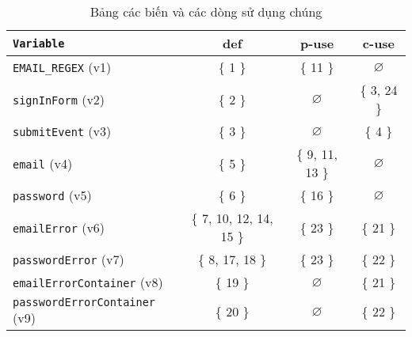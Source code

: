 \documentclass{article}
\begin{document}
\FloatBarrier
\begin{table}[htp]
    \centering
    \begin{tabular}{l|c|c|c}
        \texttt{Variable}                    & def                        & p-use                 & c-use      \\
        \toprule
        \bottomrule
        \texttt{EMAIL\_REGEX} (v1)           & \{ 1 \}                    & \{ 11 \}              & $\varnothing$           \\
        \hline
        \texttt{signInForm} (v2)             & \{ 2 \}                    & $\varnothing$         & \{ 3, 24 \}             \\
        \hline
        \texttt{submitEvent} (v3)            & \{ 3 \}                    & $\varnothing$         & \{ 4 \}                 \\
        \hline
        \texttt{email} (v4)                  & \{ 5 \}                    & \{ 9, 11, 13 \}       & $\varnothing$           \\
        \hline
        \texttt{password} (v5)               & \{ 6 \}                    & \{ 16 \}              & $\varnothing$           \\
        \hline
        \texttt{emailError} (v6)             & \{ 7, 10, 12, 14, 15 \}    & \{ 23 \}              & \{ 21 \}                \\
        \hline
        \texttt{passwordError} (v7)          & \{ 8, 17, 18 \}            & \{ 23 \}              & \{ 22 \}                \\
        \hline
        \texttt{emailErrorContainer} (v8)    & \{ 19 \}                   & $\varnothing$         & \{ 21 \}                \\
        \hline
        \texttt{passwordErrorContainer} (v9) & \{ 20 \}                   & $\varnothing$         & \{ 22 \}                \\
    \end{tabular}
    \caption{Bảng các biến và các dòng sử dụng chúng}
    {\label{table:variable-usage}}
\end{table}
\FloatBarrier
\end{document}
